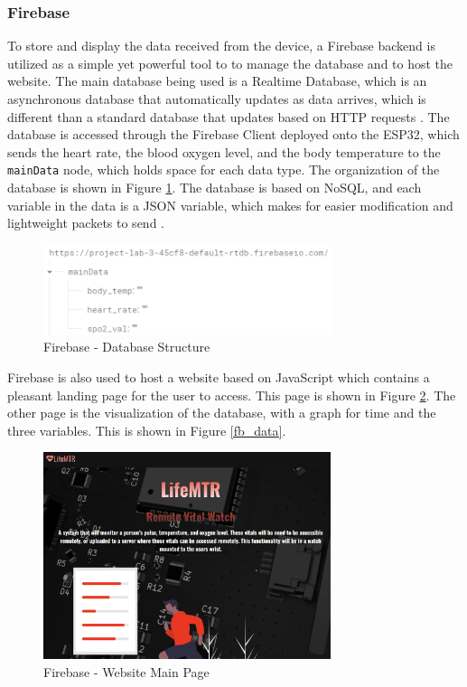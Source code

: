 \documentclass[12pt]{article}
\begin{document}
    \subsubsection{Firebase}
    To store and display the data received from the device, a Firebase backend is utilized as a simple yet powerful tool to to manage the database and to host the website. The main database being used is a Realtime Database, which is an asynchronous database that automatically updates as data arrives, which is different than a standard database that updates based on HTTP requests \cite{firebase}. The database is accessed through the Firebase Client deployed onto the ESP32, which sends the heart rate, the blood oxygen level, and the body temperature to the \verb|mainData| node, which holds space for each data type. The organization of the database is shown in Figure \ref{fb_struct}. The database is based on NoSQL, and each variable in the data is a JSON variable, which makes for easier modification and lightweight packets to send \cite{firebase}. 

    \begin{figure}[hbt!]
        \centering
        \includegraphics[width=0.75\textwidth]{firebase_structure}
        \caption{Firebase - Database Structure}
        \label{fb_struct}
    \end{figure} 

    Firebase is also used to host a website based on JavaScript which contains a pleasant landing page for the user to access. This page is shown in Figure \ref{fb_website}. The other page is the visualization of the database, with a graph for time and the three variables.  This is shown in Figure \ref{fb_data}.

    \begin{figure}[hbt!]
        \centering
        \includegraphics[width=0.75\textwidth]{images/fb_website.png}
        \caption{Firebase - Website Main Page}
        \label{fb_website}
    \end{figure} 
\end{document}
